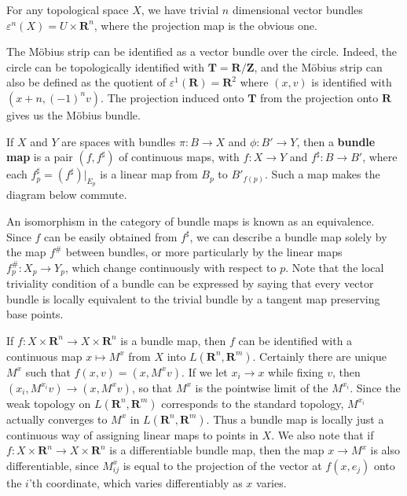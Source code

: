 \begin{example}
    For any topological space $X$, we have trivial $n$ dimensional vector bundles $\varepsilon^n(X) = U \times \mathbf{R}^n$, where the projection map is the obvious one.
\end{example}

\begin{example}
    The M\"{o}bius strip can be identified as a vector bundle over the circle. Indeed, the circle can be topologically identified with $\mathbf{T} = \mathbf{R}/\mathbf{Z}$, and the M\"{o}bius strip can also be defined as the quotient of $\varepsilon^1(\mathbf{R}) = \mathbf{R}^2$ where $(x,v)$ is identified with $(x + n, (-1)^n v)$. The projection induced onto $\mathbf{T}$ from the projection onto $\mathbf{R}$ gives us the M\"{o}bius bundle.
\end{example}

If $X$ and $Y$ are spaces with bundles $\pi: B \to X$ and $\phi: B' \to Y$, then a {\bf bundle map} is a pair $(f,f^\sharp)$ of continuous maps, with $f:X \to Y$ and $f^\sharp:B \to B'$, where each $f^\sharp_p = (f^\sharp)|_{E_p}$ is a linear map from $B_p$ to $B'_{f(p)}$. Such a map makes the diagram below commute.
%
\begin{center}
\end{center}
%
An isomorphism in the category of bundle maps is known as an equivalence. Since $f$ can be easily obtained from $f^\sharp$, we can describe a bundle map solely by the map $f^\#$ between bundles, or more particularly by the linear maps $f^\#_p: X_p \to Y_p$, which change continuously with respect to $p$. Note that the local triviality condition of a bundle can be expressed by saying that every vector bundle is locally equivalent to the trivial bundle by a tangent map preserving base points.

If $f: X \times \mathbf{R}^n \to X \times \mathbf{R}^n$ is a bundle map, then $f$ can be identified with a continuous map $x \mapsto M^x$ from $X$ into $L(\mathbf{R}^n, \mathbf{R}^m)$. Certainly there are unique $M^x$ such that $f(x,v) = (x, M^x v)$. If we let $x_i \to x$ while fixing $v$, then $(x_i,M^{x_i} v) \to (x, M^x v)$, so that $M^x$ is the pointwise limit of the $M^{x_i}$. Since the weak topology on $L(\mathbf{R}^n, \mathbf{R}^m)$ corresponds to the standard topology, $M^{x_i}$ actually converges to $M^x$ in $L(\mathbf{R}^n, \mathbf{R}^m)$. Thus a bundle map is locally just a continuous way of assigning linear maps to points in $X$. We also note that if $f: X \times \mathbf{R}^n \to X \times \mathbf{R}^n$ is a differentiable bundle map, then the map $x \to M^x$ is also differentiable, since $M^x_{ij}$ is equal to the projection of the vector at $f(x,e_j)$ onto the $i$'th coordinate, which varies differentiably as $x$ varies.

